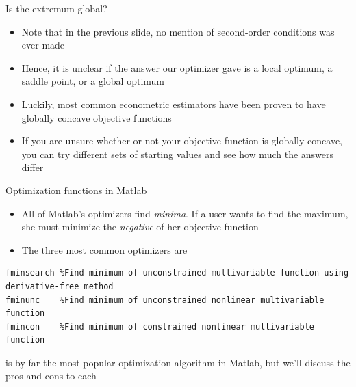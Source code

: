 \documentclass[english,xcolor=dvipsnames]{beamer}
\begin{document}
\begin{frame}{Is the extremum global?}
\begin{itemize}
	\item Note that in the previous slide, no mention of second-order conditions was ever made
	\item Hence, it is unclear if the answer our optimizer gave is a local optimum, a saddle point, or a global optimum
	\item Luckily, most common econometric estimators have been proven to have globally concave objective functions
	\item If you are unsure whether or not your objective function is globally concave, you can try different sets of starting values and see how much the answers differ
\end{itemize}
\end{frame}

\begin{frame}[fragile]{Optimization functions in Matlab}
\begin{itemize}
	\item All of Matlab's optimizers find \emph{minima}. If a user wants to find the maximum, she must minimize the \emph{negative} of her objective function
	\item The three most common optimizers are
\end{itemize}
\begin{lstlisting}
fminsearch %Find minimum of unconstrained multivariable function using derivative-free method
fminunc    %Find minimum of unconstrained nonlinear multivariable function
fmincon    %Find minimum of constrained nonlinear multivariable function
\end{lstlisting}
 is by far the most popular optimization algorithm in Matlab, but we'll discuss the pros and cons to each
\end{frame}
\end{document}
